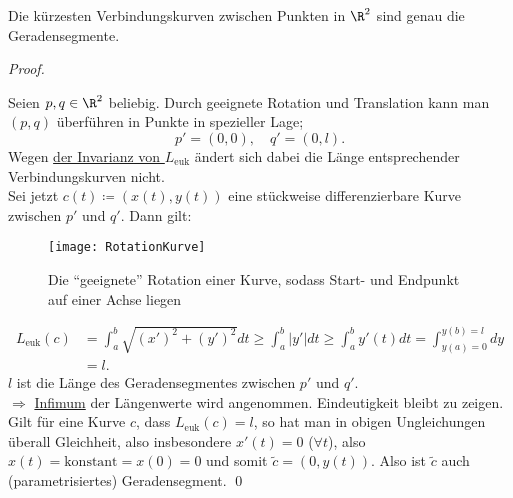 \begin{lemma}\label{lemma:geradenkurz}
  Die kürzesten Verbindungskurven zwischen Punkten in \( \R^2 \) sind genau die Geradensegmente. \\
  \begin{proof}
    \  \\
    \begin{minipage}{.45\textwidth}
      Seien \( p, q \in \R^2 \) beliebig. Durch geeignete Rotation und Translation kann man \( (p,q) \) überführen in Punkte in spezieller Lage;
      \begin{equation*}
        p' = (0,0), \quad q' = (0,l)\text{.}
      \end{equation*}
      Wegen \hyperref[lm:leuklinvarianz]{der Invarianz von \( L_\text{euk} \)} ändert sich dabei die Länge entsprechender Verbindungskurven nicht. \\
      Sei jetzt \( c(t) \coloneqq (x(t),y(t)) \) eine stückweise differenzierbare Kurve zwischen \( p' \) und \( q' \). Dann gilt:
    \end{minipage}
    \hfill
    \begin{minipage}{.45\textwidth}
      \begin{figure}[H]
        \texttt{[image: RotationKurve]}
        \caption{Die ``geeignete'' Rotation einer Kurve, sodass Start- und Endpunkt auf einer Achse liegen}
      \end{figure}
    \end{minipage}
    \begin{align*}
      L_\text{euk}(c) &= \int_a^b\sqrt{{(x')}^2+{(y')}^2}dt \geq \int_a^b\vert y' \vert dt \geq \int_a^b y'(t)dt = \int_{y(a) = 0}^{y(b) = l} dy \\
       &= l\text{.}
    \end{align*}
    \( l \) ist die Länge des Geradensegmentes zwischen \( p' \) und \( q' \). \\
    \( \Rightarrow \) \underline{Infimum} der Längenwerte wird angenommen. Eindeutigkeit bleibt zu zeigen. \\
    Gilt für eine Kurve \( c \), dass \( L_\text{euk}(c) = l \), so hat man in obigen Ungleichungen überall Gleichheit, also insbesondere \( x'(t) = 0 \) (\( \forall t \)), also \( x(t) = \text{konstant} = x(0) = 0 \) und somit \( \widetilde{c} = (0,y(t)) \). Also ist \( \widetilde{c} \) auch (parametrisiertes) Geradensegment. \qed{}
  \end{proof}
\end{lemma}

